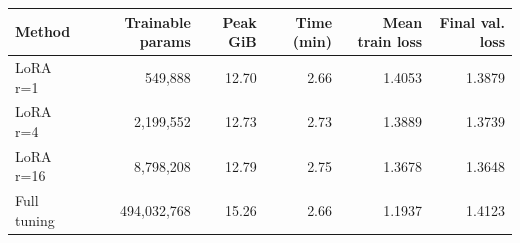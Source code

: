 \begin{tabular}{lrrrrr}
\toprule
Method & Trainable params & Peak GiB & Time (min) & Mean train loss & Final val. loss \\
\midrule
LoRA r=1 & 549,888 & 12.70 & 2.66 & 1.4053 & 1.3879 \\
LoRA r=4 & 2,199,552 & 12.73 & 2.73 & 1.3889 & 1.3739 \\
LoRA r=16 & 8,798,208 & 12.79 & 2.75 & 1.3678 & 1.3648 \\
Full tuning & 494,032,768 & 15.26 & 2.66 & 1.1937 & 1.4123 \\
\bottomrule
\end{tabular}
